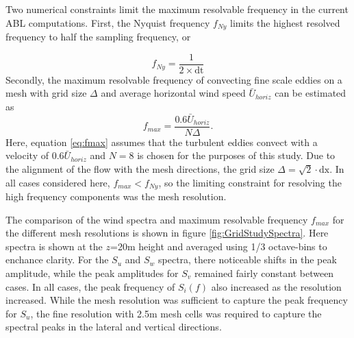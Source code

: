 Two numerical constraints limit the maximum resolvable frequency in
the current ABL computations.  First, the Nyquist frequency $f_{Ny}$
limits the highest resolved frequency to half the sampling frequency, or

\begin{equation}
  f_{Ny} = \frac{1}{2\times \textrm{dt}}
\end{equation}
Secondly, the maximum resolvable frequency of convecting fine scale
eddies on a mesh with grid size $\Delta$ and average horizontal wind
speed $\bar{U}_{horiz}$ can be estimated as
\begin{equation}
  \label{eq:fmax}
  f_{max} = \frac{0.6\bar{U}_{horiz}}{N\Delta}.
\end{equation}
Here, equation \ref{eq:fmax} assumes that the turbulent eddies convect
with a velocity of $0.6\bar{U}_{horiz}$ and $N=8$ is chosen for the
purposes of this study.  Due to the alignment of the flow with the
mesh directions, the grid size $\Delta = \sqrt{2}\cdot \textrm{dx}$.
In all cases considered here, $f_{max} < f_{Ny}$, so the limiting
constraint for resolving the high frequency components was the mesh
resolution.

The comparison of the wind spectra and maximum resolvable frequency
$f_{max}$ for the different mesh resolutions is shown in figure
\ref{fig:GridStudySpectra}.  Here spectra is shown at the $z$=20m
height and averaged using 1/3 octave-bins to enchance clarity. For the
$S_u$ and $S_w$ spectra, there noticeable shifts in the peak
amplitude, while the peak amplitudes for $S_v$ remained fairly
constant between cases.  In all cases, the peak frequency of $S_i(f)$
also increased as the resolution increased. While the mesh resolution
was sufficient to capture the peak frequency for $S_u$, the fine
resolution with 2.5m mesh cells was required to capture the spectral
peaks in the lateral and vertical directions.

